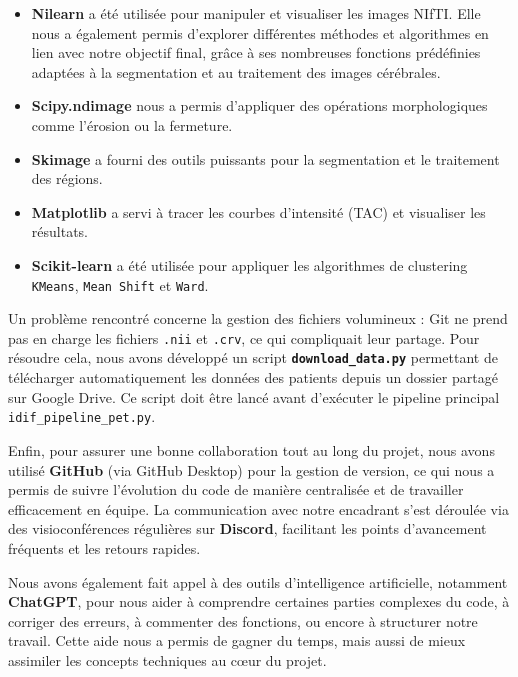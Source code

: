 \documentclass{article}
\begin{document}
    \begin{itemize}
        \item \textbf{Nilearn} a été utilisée pour manipuler et visualiser les images NIfTI. Elle nous a également permis d’explorer différentes méthodes et algorithmes en lien avec notre objectif final, grâce à ses nombreuses fonctions prédéfinies adaptées à la segmentation et au traitement des images cérébrales.
        \item \textbf{Scipy.ndimage} nous a permis d’appliquer des opérations morphologiques comme l’érosion ou la fermeture.
        \item \textbf{Skimage} a fourni des outils puissants pour la segmentation et le traitement des régions.
        \item \textbf{Matplotlib} a servi à tracer les courbes d’intensité (TAC) et visualiser les résultats.
        \item \textbf{Scikit-learn} a été utilisée pour appliquer les algorithmes de clustering \texttt{KMeans}, \texttt{Mean Shift} et \texttt{Ward}.
    \end{itemize}
    
        Un problème rencontré concerne la gestion des fichiers volumineux : Git ne prend pas en charge les fichiers \texttt{.nii} et \texttt{.crv}, ce qui compliquait leur partage. Pour résoudre cela, nous avons développé un script \textbf{\texttt{download\_data.py}} permettant de télécharger automatiquement les données des patients depuis un dossier partagé sur Google Drive. Ce script doit être lancé avant d’exécuter le pipeline principal \texttt{idif\_pipeline\_pet.py}.
    
        Enfin, pour assurer une bonne collaboration tout au long du projet, nous avons utilisé \textbf{GitHub} (via GitHub Desktop) pour la gestion de version, ce qui nous a permis de suivre l’évolution du code de manière centralisée et de travailler efficacement en équipe. La communication avec notre encadrant s’est déroulée via des visioconférences régulières sur \textbf{Discord}, facilitant les points d’avancement fréquents et les retours rapides.
    
        Nous avons également fait appel à des outils d’intelligence artificielle, notamment \textbf{ChatGPT}, pour nous aider à comprendre certaines parties complexes du code, à corriger des erreurs, à commenter des fonctions, ou encore à structurer notre travail. Cette aide nous a permis de gagner du temps, mais aussi de mieux assimiler les concepts techniques au cœur du projet.
\end{document}
